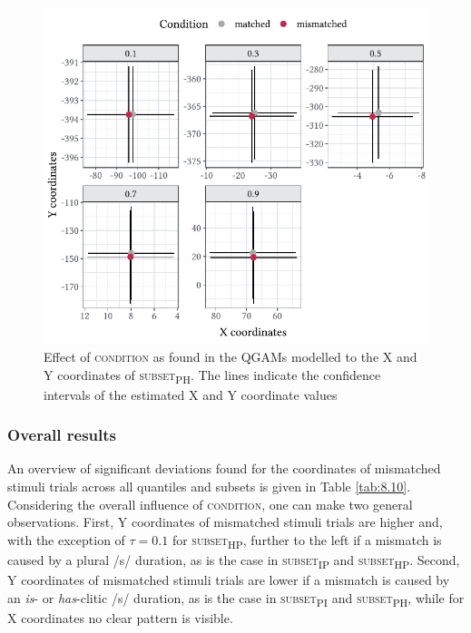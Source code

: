 \begin{figure}
    \centering
    \includegraphics[]{figures/fig8.6.pdf}
    \caption{Effect of \textsc{condition} as found in the QGAMs modelled to the X and Y coordinates of \textsc{subset\textsubscript{PH}}. The lines indicate the confidence intervals of the estimated X and Y coordinate values}
    \label{fig:8_6}
\end{figure}

\subsubsection{Overall results}\label{section08_2_2_5}

An overview of significant deviations found for the coordinates of mismatched stimuli trials across all quantiles and subsets is given in Table \ref{tab:8.10}. Considering the overall influence of \textsc{condition}, one can make two general observations. First, Y coordinates of mismatched stimuli trials are higher and, with the exception of $\tau=0.1$ for \textsc{subset\textsubscript{HP}}, further to the left if a mismatch is caused by a plural /s/ duration, as is the case in \textsc{subset\textsubscript{IP}} and \textsc{subset\textsubscript{HP}}. Second, Y coordinates of mismatched stimuli trials are lower if a mismatch is caused by an \textit{is}- or \textit{has}-clitic /s/ duration, as is the case in \textsc{subset\textsubscript{PI}} and \textsc{subset\textsubscript{PH}}, while for X coordinates no clear pattern is visible.

